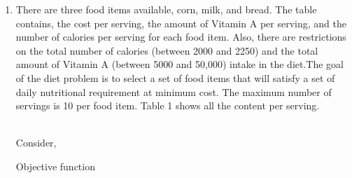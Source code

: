 \documentclass[journal,12pt,twocolumn]{IEEEtran}
\begin{document}
\begin{enumerate}
\item There are three food items available, corn, milk, and bread. The table contains,
the cost per serving, the amount of Vitamin A per serving, and the number of
calories per serving for each food item. Also, there are restrictions on the total
number of calories (between 2000 and 2250) and the total amount of Vitamin A
(between 5000 and 50,000) intake in the diet.The goal of the diet problem is to
select a set of food items that will satisfy a set of daily nutritional requirement
at minimum cost. The maximum number of servings is 10 per food item. Table 1 shows all the content per serving.\\
\begin{table}[H]
 \centering
 \caption{}
 \end{table}
\solution\\ 
Consider,\\
\begin{table}[H]
 \centering
 \caption{}
 \end{table}
Objective function 

\end{enumerate}
\end{document}
